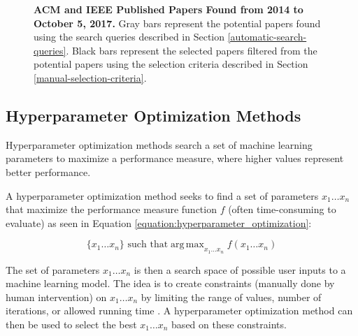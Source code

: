 \begin{figure}
\begin{center}
\caption{\textbf{ACM and IEEE Published Papers Found from 2014 to October 5, 2017.} Gray bars represent the potential papers found using the search queries described in Section \ref{automatic-search-queries}. Black bars represent the selected papers filtered from the potential papers using the selection criteria described in Section \ref{manual-selection-criteria}.}
\label{figure:papers_yearly}
\end{center}
\end{figure}


\subsection{Hyperparameter Optimization Methods} \label{hyperparameter-optimization-methods}

Hyperparameter optimization methods search a set of machine learning parameters to maximize a performance measure, where higher values represent better performance.

A hyperparameter optimization method seeks to find a set of parameters $x_1 \dots x_n$ that maximize the performance measure function $f$ (often time-consuming to evaluate) as seen in Equation \ref{equation:hyperparameter_optimization}:

\begin{equation}
\label{equation:hyperparameter_optimization}
	\{x_1 \dots x_n\} \textrm{ such that} \operatorname{arg\,max}_{x_1 \dots x_n} f(x_1 \dots x_n)
\end{equation}

The set of parameters $x_1 \dots x_n$ is then a search space of possible user inputs to a machine learning model. The idea is to create constraints (manually done by human intervention) on $x_1 \dots x_n$ by limiting the range of values, number of iterations, or allowed running time \cite{Bergstra:2011}. A hyperparameter optimization method can then be used to select the best $x_1 \dots x_n$ based on these constraints.

